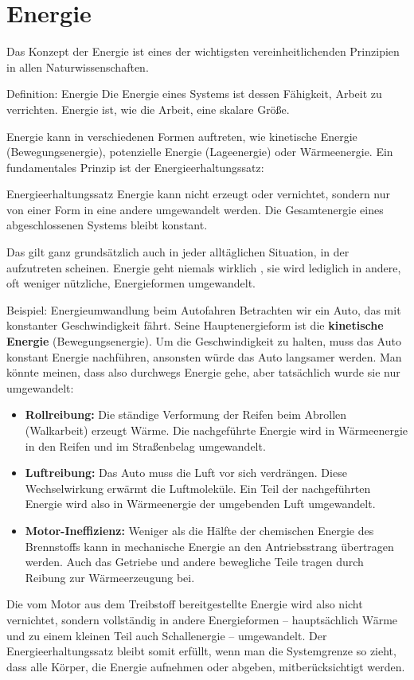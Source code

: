\section{Energie}\label{sec: energie}
Das Konzept der Energie ist eines der wichtigsten vereinheitlichenden Prinzipien in allen Naturwissenschaften. 
\begin{rememberbox}{Definition: Energie}
    Die Energie eines Systems ist dessen Fähigkeit, Arbeit zu verrichten. Energie ist, wie die Arbeit, eine skalare Größe. 
\end{rememberbox}
Energie kann in verschiedenen Formen auftreten, wie \zB kinetische Energie (Bewegungsenergie), potenzielle Energie (Lageenergie) oder Wärmeenergie. Ein fundamentales Prinzip ist der Energieerhaltungssatz:
\begin{importantbox}{Energieerhaltungssatz}
    Energie kann nicht erzeugt oder vernichtet, sondern nur von einer Form in eine andere umgewandelt werden. Die Gesamtenergie eines abgeschlossenen Systems bleibt konstant. 
\end{importantbox}
Das gilt ganz grundsätzlich auch in jeder alltäglichen Situation, in der  aufzutreten scheinen. Energie geht niemals wirklich , sie wird lediglich in andere, oft weniger nützliche, Energieformen umgewandelt.

\begin{examplebox}[breakable]{Beispiel: Energieumwandlung beim Autofahren}
    Betrachten wir ein Auto, das mit konstanter Geschwindigkeit fährt. Seine Hauptenergieform ist die \textbf{kinetische Energie} (Bewegungsenergie). Um die Geschwindigkeit zu halten, muss das Auto konstant Energie nachführen, ansonsten würde das Auto langsamer werden. Man könnte meinen, dass also durchwegs Energie  gehe, aber tatsächlich wurde sie nur umgewandelt:
    \begin{itemize}
        \item \textbf{Rollreibung:} Die ständige Verformung der Reifen beim Abrollen (Walkarbeit) erzeugt Wärme. Die nachgeführte Energie wird in Wärmeenergie in den Reifen und im Straßenbelag umgewandelt.
        \item \textbf{Luftreibung:} Das Auto muss die Luft vor sich verdrängen. Diese Wechselwirkung erwärmt die Luftmoleküle. Ein Teil der nachgeführten Energie wird also in Wärmeenergie der umgebenden Luft umgewandelt.
        \item \textbf{Motor-Ineffizienz:} Weniger als die Hälfte der chemischen Energie des Brennstoffs kann in mechanische Energie an den Antriebsstrang übertragen werden. Auch das Getriebe und andere bewegliche Teile tragen durch Reibung zur Wärmeerzeugung bei.
    \end{itemize}
    Die vom Motor aus dem Treibstoff bereitgestellte Energie wird also nicht vernichtet, sondern vollständig in andere Energieformen -- hauptsächlich Wärme und zu einem kleinen Teil auch Schallenergie -- umgewandelt. Der Energieerhaltungssatz bleibt somit erfüllt, wenn man die Systemgrenze so zieht, dass alle Körper, die Energie aufnehmen oder abgeben, mitberücksichtigt werden. 
\end{examplebox}

